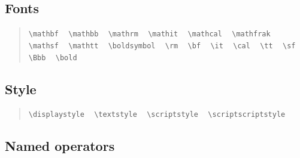 \documentclass{article}
\newcommand{\texcommand}[1]{\textbackslash{}#1}
\newcommand{\spacer}{\,\,\, \hfil}
\newcommand{\lastspacer}{\hfill\hfill\hfill}
\newenvironment{mylist}{\begin{quote}}{\end{quote}}
\begin{document}
\subsection{Fonts}

\begin{mylist}
\texttt{\texcommand{mathbf}} \spacer
\texttt{\texcommand{mathbb}} \spacer
\texttt{\texcommand{mathrm}} \spacer
\texttt{\texcommand{mathit}} \spacer
\texttt{\texcommand{mathcal}} \spacer
\texttt{\texcommand{mathfrak}} \spacer
\texttt{\texcommand{mathsf}} \spacer
\texttt{\texcommand{mathtt}} \spacer
\texttt{\texcommand{boldsymbol}} \spacer
\texttt{\texcommand{rm}} \spacer
\texttt{\texcommand{bf}} \spacer
\texttt{\texcommand{it}} \spacer
\texttt{\texcommand{cal}} \spacer
\texttt{\texcommand{tt}} \spacer
\texttt{\texcommand{sf}} \spacer
\texttt{\texcommand{Bbb}} \spacer
\texttt{\texcommand{bold}} \lastspacer
\end{mylist}

\subsection{Style}

\begin{mylist}
\texttt{\texcommand{displaystyle}} \spacer
\texttt{\texcommand{textstyle}} \spacer
\texttt{\texcommand{scriptstyle}} \spacer
\texttt{\texcommand{scriptscriptstyle}} \lastspacer
\end{mylist}

\subsection{Named operators}
\end{document}
